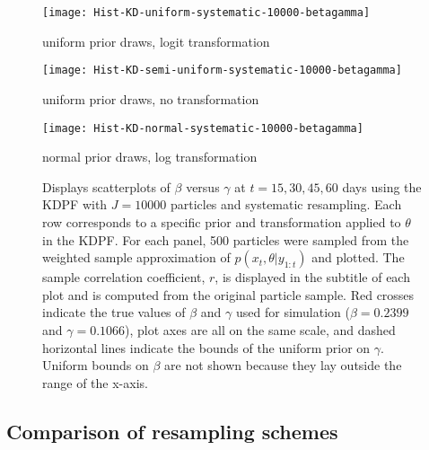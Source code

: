 \documentclass{elsarticle}
\begin{document}
\begin{figure}

\begin{minipage}{1.0\linewidth}
\texttt{[image: Hist-KD-uniform-systematic-10000-betagamma]}
\vspace{-1.0cm}
\caption*{uniform prior draws, logit transformation}
\end{minipage}

\vspace{0.5cm}

\begin{minipage}{1.0\linewidth}
\texttt{[image: Hist-KD-semi-uniform-systematic-10000-betagamma]}
\vspace{-1.0cm}
\caption*{uniform prior draws, no transformation}
\end{minipage}

\vspace{0.5cm}

\begin{minipage}{1.0\linewidth}
\texttt{[image: Hist-KD-normal-systematic-10000-betagamma]}
\vspace{-1.0cm}
\caption*{normal prior draws, log transformation}
\end{minipage}

\caption{Displays scatterplots of $\beta$ versus $\gamma$ at $t = 15, 30, 45, 60$ days using the KDPF with $J = 10000$ particles and systematic resampling.  Each row corresponds to a specific prior and transformation applied to $\theta$ in the KDPF.  For each panel, 500 particles were sampled from the weighted sample approximation of $p(x_t,\theta|y_{1:t})$ and plotted.  The sample correlation coefficient, $r$, is displayed in the subtitle of each plot and is computed from the original particle sample.  Red crosses indicate the true values of $\beta$ and $\gamma$ used for simulation ($\beta = 0.2399$ and $\gamma = 0.1066$), plot axes are all on the same scale, and dashed horizontal lines indicate the bounds of the uniform prior on $\gamma$.  Uniform bounds on $\beta$ are not shown because they lay outside the range of the x-axis.} \label{fig:priors}

\end{figure}

\subsection{Comparison of resampling schemes}
\end{document}
